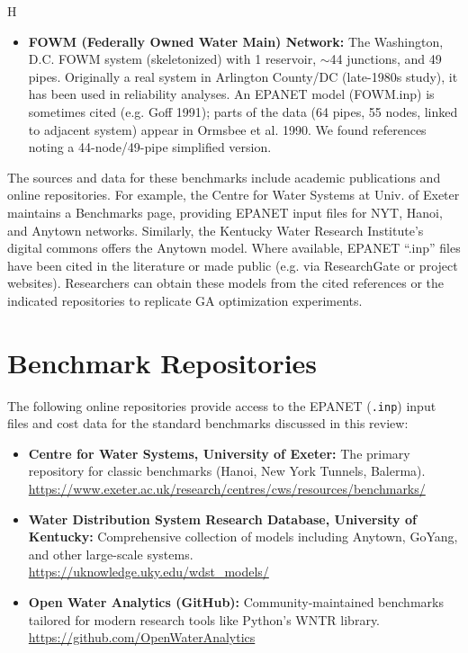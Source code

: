 H\documentclass[12pt, a4paper]{article}
\begin{document}
\begin{itemize}
    \item \textbf{FOWM (Federally Owned Water Main) Network:} The Washington, D.C. FOWM system (skeletonized) with 1 reservoir, $\sim$44 junctions, and 49 pipes\cite{ref21}. Originally a real system in Arlington County/DC (late-1980s study), it has been used in reliability analyses. An EPANET model (FOWM.inp) is sometimes cited (e.g. Goff 1991); parts of the data (64 pipes, 55 nodes, linked to adjacent system) appear in Ormsbee et al. 1990. We found references noting a 44-node/49-pipe simplified version\cite{ref21}.
\end{itemize}

The sources and data for these benchmarks include academic publications and online repositories. For example, the Centre for Water Systems at Univ. of Exeter maintains a Benchmarks page, providing EPANET input files for NYT, Hanoi, and Anytown networks\cite{ref19}. Similarly, the Kentucky Water Research Institute's digital commons offers the Anytown model\cite{ref20}. Where available, EPANET ``.inp'' files have been cited in the literature or made public (e.g. via ResearchGate or project websites). Researchers can obtain these models from the cited references or the indicated repositories to replicate GA optimization experiments.

\section*{Benchmark Repositories}

The following online repositories provide access to the EPANET (\texttt{.inp}) input files and cost data for the standard benchmarks discussed in this review:

\begin{itemize}
    \item \textbf{Centre for Water Systems, University of Exeter:} The primary repository for classic benchmarks (Hanoi, New York Tunnels, Balerma). \\ \url{https://www.exeter.ac.uk/research/centres/cws/resources/benchmarks/}
    \item \textbf{Water Distribution System Research Database, University of Kentucky:} Comprehensive collection of models including Anytown, GoYang, and other large-scale systems. \\ \url{https://uknowledge.uky.edu/wdst_models/}
    \item \textbf{Open Water Analytics (GitHub):} Community-maintained benchmarks tailored for modern research tools like Python's WNTR library. \\ \url{https://github.com/OpenWaterAnalytics}
\end{itemize}
\end{document}
